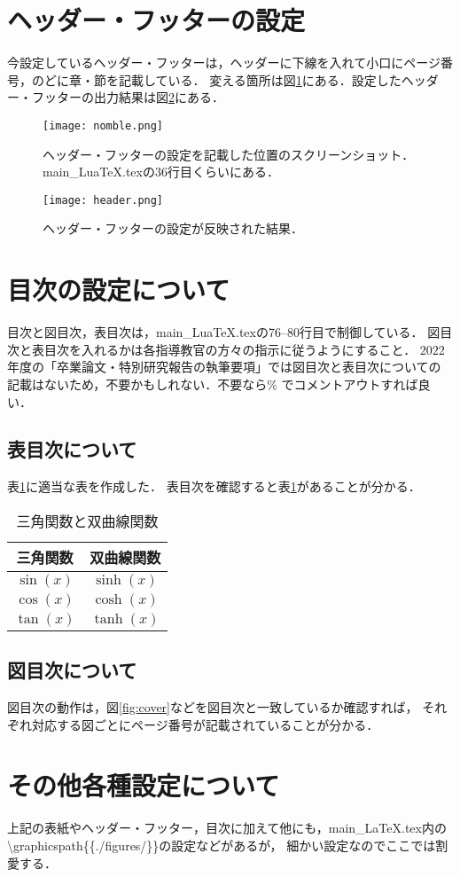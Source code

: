 \section{ヘッダー・フッターの設定}
今設定しているヘッダー・フッターは，ヘッダーに下線を入れて小口にページ番号，のどに章・節を記載している．
変える箇所は図\ref{fig:nomble}にある．設定したヘッダー・フッターの出力結果は図\ref{fig:header}にある．

\begin{figure}[h]
  \centering
  \texttt{[image: nomble.png]}
  \caption{ヘッダー・フッターの設定を記載した位置のスクリーンショット．main\_LuaTeX.texの$36$行目くらいにある．}
  \label{fig:nomble}
\end{figure}
\begin{figure}[h]
  \centering
  \texttt{[image: header.png]}
  \caption{ヘッダー・フッターの設定が反映された結果．}
  \label{fig:header}
\end{figure}


\section{目次の設定について}
目次と図目次，表目次は，main\_LuaTeX.texの76--80行目で制御している．
図目次と表目次を入れるかは各指導教官の方々の指示に従うようにすること．
$2022$年度の「卒業論文・特別研究報告の執筆要項」では図目次と表目次についての
記載はないため，不要かもしれない．不要なら\% でコメントアウトすれば良い．

\subsection{表目次について}
表\ref{tab:triangle}に適当な表を作成した．
表目次を確認すると表\ref{tab:triangle}があることが分かる．

\begin{table}[htbp]
  \centering
  \caption{三角関数と双曲線関数}
  \begin{tabular}{cc} \hline 
    三角関数 & 双曲線関数 \\ \hline
    $\sin(x)$ & $\sinh(x)$ \\
    $\cos(x)$ & $\cosh(x)$ \\
    $\tan(x)$ & $\tanh(x)$ \\ \hline
  \end{tabular}
  \label{tab:triangle}
\end{table}


\subsection{図目次について}
図目次の動作は，図\ref{fig:cover}などを図目次と一致しているか確認すれば，
それぞれ対応する図ごとにページ番号が記載されていることが分かる．


\section{その他各種設定について}
上記の表紙やヘッダー・フッター，目次に加えて他にも，main\_LaTeX.tex内の
\textbackslash graphicspath\{\{./figures/\}\}の設定などがあるが，
細かい設定なのでここでは割愛する．